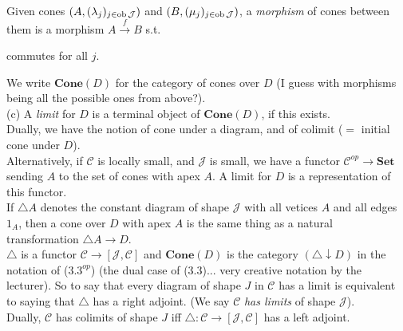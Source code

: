 \documentclass[a4paper]{article}
\begin{document}
\begin{defi}
    Given cones $(A,(\lambda_j)_{j \in \operatorname{ob} \mathcal{J}})$ and $(B,(\mu_j)_{j \in \operatorname{ob} \mathcal{J}})$, a \emph{morphism} of cones between them is a morphism $A \xrightarrow{f} B$ s.t.
    commutes for all $j$.

    We write $\mathbf{Cone}(D)$ for the category of cones over $D$ (I guess with morphisms being all the possible ones from above?).\\
    (c) A \emph{limit} for $D$ is a terminal object of $\mathbf{Cone}(D)$, if this exists.\\
    Dually, we have the notion of cone under a diagram, and of colimit ($=$ initial cone under $D$).\\
    Alternatively, if $\mathcal{C}$ is locally small, and $\mathcal{J}$ is small, we have a functor $\mathcal{C}^{op} \to \mathbf{Set}$ sending $A$ to the set of cones with apex $A$. A limit for $D$ is a representation of this functor.\\
    If $\triangle A$ denotes the constant diagram of shape $\mathcal{J}$ with all vetices $A$ and all edges $1_A$, then a cone over $D$ with apex $A$ is the same thing as a natural transformation $\triangle A \to D$.\\
    $\triangle$ is a functor $\mathcal{C} \to [\mathcal{J}, \mathcal{C}]$ and $\mathbf{Cone}(D)$ is the category $(\triangle \downarrow D)$ in the notation of ($3.3^{op}$) (the dual case of (3.3)... very creative notation by the lecturer). So to say that every diagram of shape $J$ in $\mathcal{C}$ has a limit is equivalent to saying that $\triangle$ has a right adjoint. (We say $\mathcal{C}$ \emph{has limits} of shape $\mathcal{J}$).\\
    Dually, $\mathcal{C}$ has colimits of shape $J$ iff $\triangle:\mathcal{C} \to [\mathcal{J},\mathcal{C}]$ has a left adjoint.
\end{defi}
\end{document}
